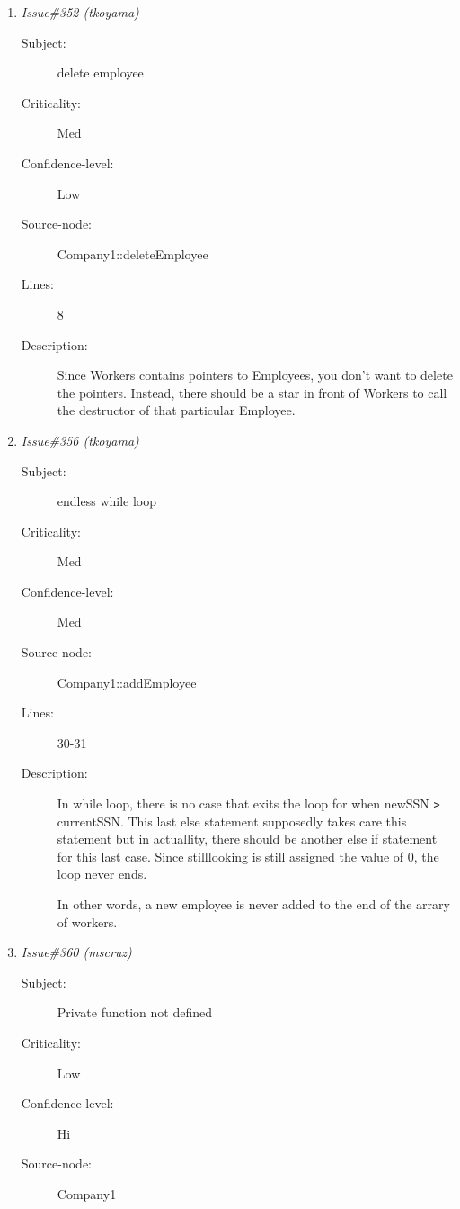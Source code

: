 \begin{enumerate}
\begin{description}
\item [Lines:] 15

\item [Description:] Need to have stars in front of both name and
newName to dereference the values in each.
\end{description}
\item {\it Issue\#352 (tkoyama)}
\begin{description}
\item [Subject:] delete employee
\item [Criticality:] Med
\item [Confidence-level:] Low
\item [Source-node:] Company1::deleteEmployee

\item [Lines:] 8

\item [Description:] Since Workers contains pointers to Employees,
you don't want to delete the pointers.  Instead, there should be a star in
front of Workers to call the destructor of that particular Employee.
\end{description}
\item {\it Issue\#356 (tkoyama)}
\begin{description}
\item [Subject:] endless while loop
\item [Criticality:] Med
\item [Confidence-level:] Med
\item [Source-node:] Company1::addEmployee

\item [Lines:] 30-31

\item [Description:] In while loop, there is no case that exits the
loop for when newSSN {\tt >} currentSSN.  This last else statement supposedly takes
care this statement but in actuallity, there should be another else if
statement for this last case.  Since stilllooking is still assigned the value
of 0, the loop never ends.

In other words, a new employee is never added to the end of the arrary of
workers.
\end{description}
\item {\it Issue\#360 (mscruz)}
\begin{description}
\item [Subject:] Private function not defined
\item [Criticality:] Low
\item [Confidence-level:] Hi
\item [Source-node:] Company1


\end{description}
\end{enumerate}
